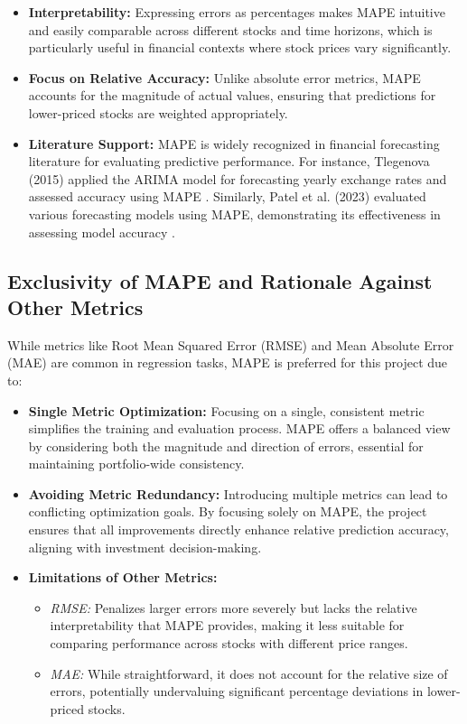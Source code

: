 \documentclass[10pt,twocolumn]{article}
\begin{document}
\begin{itemize}
    \item \textbf{Interpretability:}  
    Expressing errors as percentages makes MAPE intuitive and easily comparable across different stocks and time horizons, which is particularly useful in financial contexts where stock prices vary significantly.

    \item \textbf{Focus on Relative Accuracy:}  
    Unlike absolute error metrics, MAPE accounts for the magnitude of actual values, ensuring that predictions for lower-priced stocks are weighted appropriately.

    \item \textbf{Literature Support:}  
    MAPE is widely recognized in financial forecasting literature for evaluating predictive performance. For instance, Tlegenova (2015) applied the ARIMA model for forecasting yearly exchange rates and assessed accuracy using MAPE \cite{Tlegenova2015ExchangeRates}. Similarly, Patel et al. (2023) evaluated various forecasting models using MAPE, demonstrating its effectiveness in assessing model accuracy \cite{Patel2024StockIndexPrediction}.
\end{itemize}

\subsection{Exclusivity of MAPE and Rationale Against Other Metrics}

While metrics like Root Mean Squared Error (RMSE) and Mean Absolute Error (MAE) are common in regression tasks, MAPE is preferred for this project due to:

\begin{itemize}
    \item \textbf{Single Metric Optimization:}  
    Focusing on a single, consistent metric simplifies the training and evaluation process. MAPE offers a balanced view by considering both the magnitude and direction of errors, essential for maintaining portfolio-wide consistency.

    \item \textbf{Avoiding Metric Redundancy:}  
    Introducing multiple metrics can lead to conflicting optimization goals. By focusing solely on MAPE, the project ensures that all improvements directly enhance relative prediction accuracy, aligning with investment decision-making.

    \item \textbf{Limitations of Other Metrics:}
    \begin{itemize}
        \item \textit{RMSE:} Penalizes larger errors more severely but lacks the relative interpretability that MAPE provides, making it less suitable for comparing performance across stocks with different price ranges.
        
        \item \textit{MAE:} While straightforward, it does not account for the relative size of errors, potentially undervaluing significant percentage deviations in lower-priced stocks.
    \end{itemize}
\end{itemize}
\end{document}
